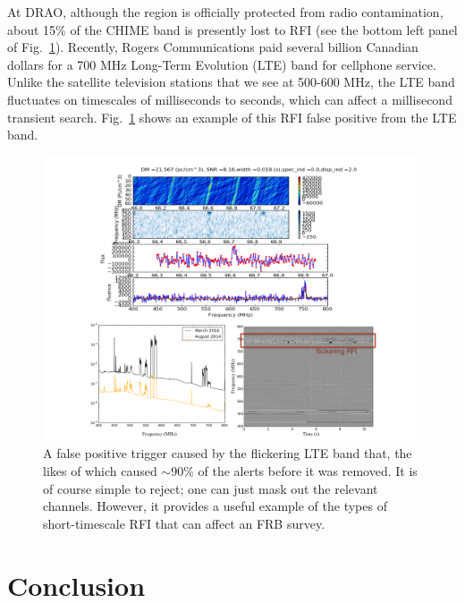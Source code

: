 At DRAO, although the region is officially 
protected from radio contamination, about 15$\%$ of the CHIME
band is presently lost to RFI (see the bottom left 
panel of Fig.~\ref{fig-lte_trigger}). Recently, Rogers Communications 
paid several billion Canadian dollars for a 700 MHz 
Long-Term Evolution (LTE) band for cellphone service.
Unlike the satellite television 
stations that we see at 500-600 MHz, the LTE band 
fluctuates on timescales of milliseconds to seconds, which can affect 
a millisecond transient search. Fig.~\ref{fig-lte_trigger} shows 
an example of this RFI false positive from the LTE band. 

\begin{figure}[!h]
\label{fig-lte_trigger}
\begin{center}
\includegraphics[trim={0in 0in 0in 0in}, scale=0.5]
{./figures/beamforming/lte_trigger.png}
\vspace{0.0cm}
\caption[abc]{A false positive trigger caused by the flickering 
LTE band that, the likes of which 
caused $\sim$90$\%$ of the alerts before it was removed.
It is of course simple to reject; one can just mask 
out the relevant channels.
However, it provides a useful example of the types of 
short-timescale RFI that can affect an FRB survey.}
\end{center}
\end{figure}



\section{Conclusion}
\label{sec:conclusion}
  



  
